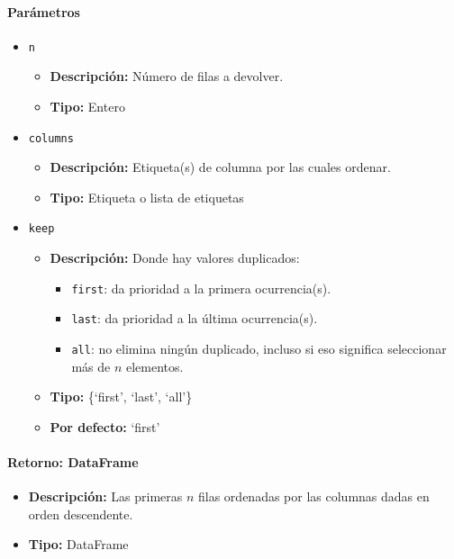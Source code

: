         \paragraph{\textbf{Parámetros}}
        \begin{itemize}
            \item \texttt{n}
                \begin{itemize}
                    \item \textbf{Descripción:} Número de filas a devolver.
                    \item \textbf{Tipo:} Entero
                \end{itemize}
            \item \texttt{columns}
                \begin{itemize}
                    \item \textbf{Descripción:} Etiqueta(s) de columna por las cuales ordenar.
                    \item \textbf{Tipo:} Etiqueta o lista de etiquetas
                \end{itemize}
            \item \texttt{keep}
                \begin{itemize}
                    \item \textbf{Descripción:} Donde hay valores duplicados:
                            \begin{itemize}
                                \item \texttt{first}: da prioridad a la primera ocurrencia(s).
                                \item \texttt{last}: da prioridad a la última ocurrencia(s).
                                \item \texttt{all}: no elimina ningún duplicado, incluso si eso significa seleccionar más de \( n \) elementos.
                            \end{itemize}
                    \item \textbf{Tipo:} \{`first', `last', `all'\}
                    \item \textbf{Por defecto:} `first'
                \end{itemize}
        \end{itemize}

        \paragraph{\textbf{Retorno:} DataFrame}
        \begin{itemize}
            \item \textbf{Descripción:} Las primeras \( n \) filas ordenadas por las columnas dadas en orden descendente.
            \item \textbf{Tipo:} DataFrame
        \end{itemize}


